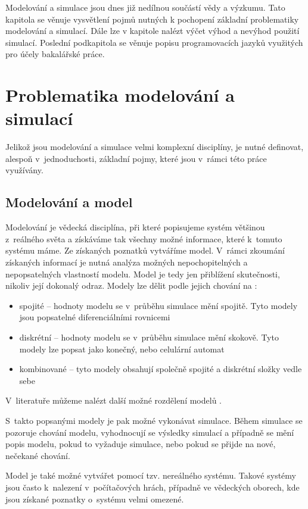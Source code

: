 Modelování a simulace jsou dnes již nedílnou součástí vědy a výzkumu. Tato kapitola se věnuje vysvětlení pojmů nutných k pochopení základní problematiky modelování a simulací. Dále lze v kapitole nalézt výčet výhod a nevýhod použití simulací. Poslední podkapitola se věnuje popisu programovacích jazyků využitých pro účely bakalářské práce.

\section{Problematika modelování a simulací}
Jelikož jsou modelování a simulace velmi komplexní disciplíny, je nutné definovat, alespoň v~jednoduchosti, základní pojmy, které jsou v~rámci této práce využívány.

\subsection{Modelování a model}
\label{modelovani}
Modelování je vědecká disciplína, při které popisujeme systém většinou z~reálného světa a získáváme tak všechny možné informace, které k~tomuto systému máme. Ze získaných poznatků vytváříme model. V~rámci zkoumání získaných informací je nutná analýza možných nepochopitelných a nepopsatelných vlastností modelu. Model je tedy jen přiblížení skutečnosti, nikoliv její dokonalý odraz. Modely lze dělit podle jejich chování na \cite{IMS-skripta}:

\begin{itemize}
    \item spojité -- hodnoty modelu se v~průběhu simulace mění spojitě. Tyto modely jsou popsatelné diferenciálními rovnicemi
    \item diskrétní -- hodnoty modelu se v~průběhu simulace mění skokově. Tyto modely lze popsat jako konečný, nebo celulární automat
    \item kombinované -- tyto modely obsahují společně spojité a diskrétní složky vedle sebe
\end{itemize}

V~literatuře můžeme nalézt další možné rozdělení modelů \cite{Cellierc2006}.
\newline

S~takto popsanými modely je pak možné vykonávat simulace. Během simulace se pozoruje chování modelu, vyhodnocují se výsledky simulací a případně se mění popis modelu, pokud to vyžaduje simulace, nebo pokud se přijde na nové, nečekané chování.

Model je také možné vytvářet pomocí tzv. nereálného systému. Takové systémy jsou často k~nalezení v~počítačových hrách, případně ve vědeckých oborech, kde jsou získané poznatky o~systému velmi omezené.

